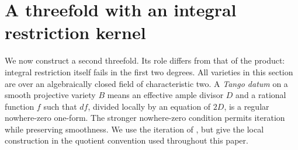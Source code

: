 \section{A threefold with an integral restriction kernel}\label{sec:injectivity}

We now construct a second threefold. Its role differs from that of the product: integral restriction itself fails in the first two degrees. All varieties in this section are over an algebraically closed field of characteristic two. A \emph{Tango datum} on a smooth projective variety $B$ means an effective ample divisor $D$ and a rational function $f$ such that $df$, divided locally by an equation of $2D$, is a regular nowhere-zero one-form. The stronger nowhere-zero condition permits iteration while preserving smoothness. We use the iteration of \citet[Proposition 2.3, p.~8 of the preprint]{Mukai}, but give the local construction in the quotient convention used throughout this paper.

